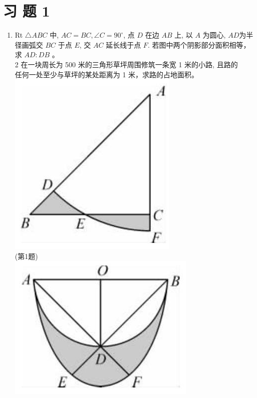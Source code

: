 \documentclass[10pt]{article}
\begin{document}
\section*{习 题 1}
\begin{enumerate}
  \item Rt $\triangle A B C$ 中, $A C=B C, \angle C=90^{\circ}$, 点 $D$ 在边 $A B$ 上, 以 $A$ 为圆心, $A D$为半径画弧交 $B C$ 于点 $E$, 交 $A C$ 延长线于点 $F$. 若图中两个阴影部分面积相等，求 $A D: D B$ 。\\
2 在一块周长为 500 米的三角形草坪周围修筑一条宽 1 米的小路, 且路的\\
任何一处至少与草坪的某处距离为 1 米，求路的占地面积。\\
\includegraphics[max width=\textwidth, center]{2024_10_30_66b8e5e701da2093c133g-015(1)}\\
(第1题)\\
\includegraphics[max width=\textwidth, center]{2024_10_30_66b8e5e701da2093c133g-015}\\

\end{enumerate}
\end{document}
